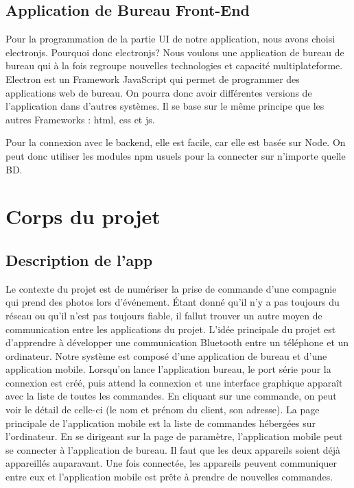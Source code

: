 \documentclass[12pt,fleqn]{article}
\begin{document}
\subsection{Application de Bureau Front-End}	
Pour la programmation de la partie UI de notre application, nous avons choisi electronjs. Pourquoi donc electronjs? 	
Nous voulons une application de bureau de bureau qui à la fois regroupe nouvelles technologies et capacité multiplateforme. Electron est un Framework JavaScript qui permet de programmer des
 applications web de bureau. On pourra donc avoir différentes versions de l’application dans d’autres systèmes. 
 Il se base sur le même principe que les autres Frameworks : html, css et js.
 
Pour la connexion avec le backend, elle est facile, car elle est basée sur Node. On peut donc utiliser les modules npm usuels pour la connecter sur n’importe quelle BD. 


\section{Corps du projet}

\subsection{Description de l'app}
Le contexte du projet est de numériser la prise de commande d'une compagnie qui prend des photos lors d'événement. Étant donné qu'il n'y a pas toujours du réseau ou qu'il n'est pas toujours fiable, il fallut trouver un autre moyen de communication entre les applications du projet. L'idée principale du projet est d'apprendre à développer une communication Bluetooth entre un téléphone et un ordinateur. Notre système est composé d'une application de bureau et d'une application mobile. Lorsqu'on lance l'application bureau, le port série pour la connexion est créé, puis attend la connexion et une interface graphique apparaît avec la liste de toutes les commandes. En cliquant sur une commande, on peut voir le détail de celle-ci (le nom et prénom du client, son adresse). La page principale de l'application mobile est la liste de commandes hébergées sur l'ordinateur. En se dirigeant sur la page de paramètre, l'application mobile peut se connecter à l'application de bureau. Il faut que les deux appareils soient déjà appareillés auparavant. Une fois connectée, les appareils peuvent communiquer entre eux et l'application mobile est prête à prendre de nouvelles commandes. 
\end{document}
